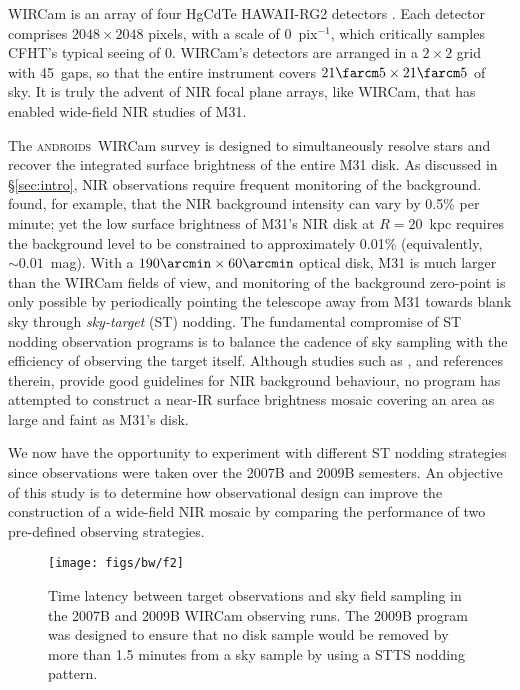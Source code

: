 \documentclass[iop,tighten]{emulateapj}
\newcommand{\androids}{\textsc{androids}}
\newcommand{\Sec}[1]{\S\ref{sec:#1}}  %
\begin{document}
WIRCam is an array of four HgCdTe HAWAII-RG2 detectors \citep{Puget:2004}.
Each detector comprises $2048\times 2048$ pixels, with a scale of 0~pix$^{-1}$, which critically samples CFHT's typical seeing of 0.
WIRCam's detectors are arranged in a $2\times 2$ grid with 45\arcsec~gaps, so that the entire instrument covers $21\farcm 5 \times 21\farcm 5$ of sky.
It is truly the advent of NIR focal plane arrays, like WIRCam, that has enabled wide-field NIR studies of M31.

The \androids\ WIRCam survey is designed to simultaneously resolve stars and recover the integrated surface brightness of the entire M31 disk.
As discussed in \Sec{intro}, NIR observations require frequent monitoring of the background.
\cite{Vaduvescu:2004} found, for example, that the NIR background intensity can vary by 0.5\% per minute; yet the low surface brightness of M31's NIR disk at $R=20$~kpc requires the background level to be constrained to approximately 0.01\% (equivalently, $\sim 0.01$~mag).
With a $190\arcmin \times 60\arcmin$ optical disk, M31 is much larger than the WIRCam fields of view, and monitoring of the background zero-point is only possible by periodically pointing the telescope away from M31 towards blank sky through \emph{sky-target} (ST) nodding. 
The fundamental compromise of ST nodding observation programs is to balance the cadence of sky sampling with the efficiency of observing the target itself.
Although studies such as \cite{Vaduvescu:2004}, and references therein, provide good guidelines for NIR background behaviour, no program has attempted to construct a near-IR surface brightness mosaic covering an area as large and faint as M31's disk.

We now have the opportunity to experiment with different ST nodding strategies since observations were taken over the 2007B and 2009B semesters.
An objective of this study is to determine how observational design can improve the construction of a wide-field NIR mosaic by comparing the performance of two pre-defined observing strategies.

\begin{figure}[t]
\centering
\texttt{[image: figs/bw/f2]}
\caption{Time latency between target observations and sky field sampling in the 2007B and 2009B WIRCam observing runs.
The 2009B program was designed to ensure that no disk sample would be removed by more than 1.5 minutes from a sky sample by using a STTS nodding pattern.}
\label{fig:sky_target_lag}
\end{figure}
\end{document}
